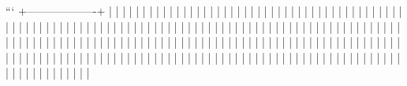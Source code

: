 ```
+-------------------+
|                   |
|                   |
|                   |
|                   |
|                   |
|                   |
|                   |
|                   |
|                   |
|                   |
|                   |
|                   |
|                   |
|                   |
|                   |
|                   |
|                   |
|                   |
|                   |
|                   |
|                   |
|                   |
|                   |
|                   |
|                   |
|                   |
|                   |
|                   |
|                   |
|                   |
|                   |
|                   |
|                   |
|                   |
|                   |
|                   |
|                   |
|                   |
|                   |
|                   |
|                   |
|                   |
|                   |
|                   |
|                   |
|                   |
|                   |
|                   |
|                   |
|                   |
|                   |
|                   |
|                   |
|                   |
|                   |
|                   |
|                   |
|                   |
|                   |
|                   |
|                   |
|                   |
|                   |
|                   |
|                   |
|                   |
|                   |
|                   |
|                   |
|                   |
|                   |
|                   |
|                   |
|                   |
|                   |
|                   |
|                   |
|                   |
|                   |
|                   |
|                   |
|                   |
|                   |
|                   |
|                   |
|                   |
|                   |
|                   |
|                   |
|                   |
|                   |
|                   |
|                   |
|                   |
|                   |
|                   |
|                   |
|                   |
|                   |
|                   |
|                   |
|                   |
|                   |
|                   |
|                   |
|                   |
|                   |
|                   |
|                   |
|                   |
|                   |
|                   |
|                   |
|                   |
|                   |
|                   |
|                   |
